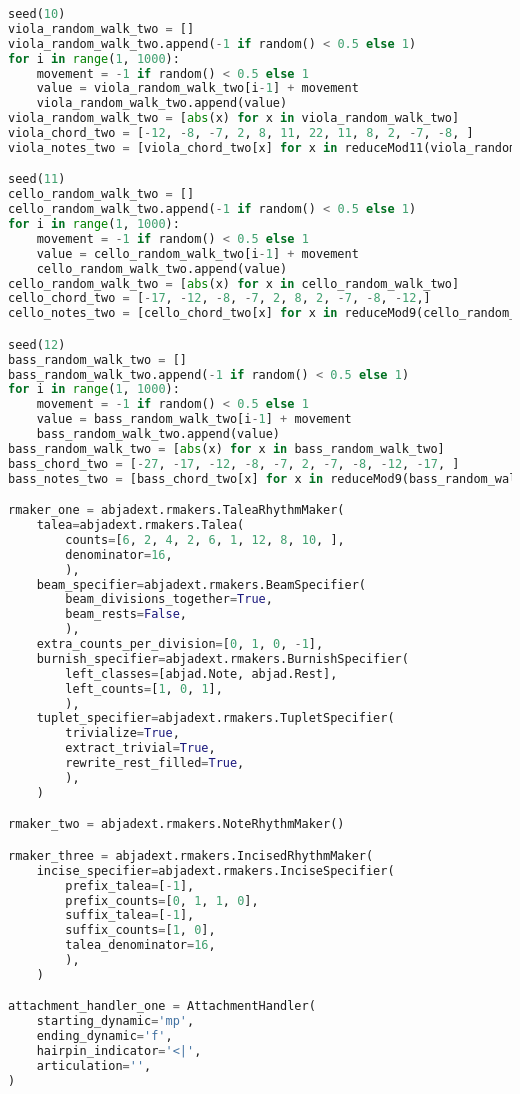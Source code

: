 \begin{lstlisting}[language=Python, caption=Tianshu Segment\_III]
seed(10)
viola_random_walk_two = []
viola_random_walk_two.append(-1 if random() < 0.5 else 1)
for i in range(1, 1000):
    movement = -1 if random() < 0.5 else 1
    value = viola_random_walk_two[i-1] + movement
    viola_random_walk_two.append(value)
viola_random_walk_two = [abs(x) for x in viola_random_walk_two]
viola_chord_two = [-12, -8, -7, 2, 8, 11, 22, 11, 8, 2, -7, -8, ]
viola_notes_two = [viola_chord_two[x] for x in reduceMod11(viola_random_walk_two)]

seed(11)
cello_random_walk_two = []
cello_random_walk_two.append(-1 if random() < 0.5 else 1)
for i in range(1, 1000):
    movement = -1 if random() < 0.5 else 1
    value = cello_random_walk_two[i-1] + movement
    cello_random_walk_two.append(value)
cello_random_walk_two = [abs(x) for x in cello_random_walk_two]
cello_chord_two = [-17, -12, -8, -7, 2, 8, 2, -7, -8, -12,]
cello_notes_two = [cello_chord_two[x] for x in reduceMod9(cello_random_walk_two)]

seed(12)
bass_random_walk_two = []
bass_random_walk_two.append(-1 if random() < 0.5 else 1)
for i in range(1, 1000):
    movement = -1 if random() < 0.5 else 1
    value = bass_random_walk_two[i-1] + movement
    bass_random_walk_two.append(value)
bass_random_walk_two = [abs(x) for x in bass_random_walk_two]
bass_chord_two = [-27, -17, -12, -8, -7, 2, -7, -8, -12, -17, ]
bass_notes_two = [bass_chord_two[x] for x in reduceMod9(bass_random_walk_two)]

rmaker_one = abjadext.rmakers.TaleaRhythmMaker(
    talea=abjadext.rmakers.Talea(
        counts=[6, 2, 4, 2, 6, 1, 12, 8, 10, ],
        denominator=16,
        ),
    beam_specifier=abjadext.rmakers.BeamSpecifier(
        beam_divisions_together=True,
        beam_rests=False,
        ),
    extra_counts_per_division=[0, 1, 0, -1],
    burnish_specifier=abjadext.rmakers.BurnishSpecifier(
        left_classes=[abjad.Note, abjad.Rest],
        left_counts=[1, 0, 1],
        ),
    tuplet_specifier=abjadext.rmakers.TupletSpecifier(
        trivialize=True,
        extract_trivial=True,
        rewrite_rest_filled=True,
        ),
    )

rmaker_two = abjadext.rmakers.NoteRhythmMaker()

rmaker_three = abjadext.rmakers.IncisedRhythmMaker(
    incise_specifier=abjadext.rmakers.InciseSpecifier(
        prefix_talea=[-1],
        prefix_counts=[0, 1, 1, 0],
        suffix_talea=[-1],
        suffix_counts=[1, 0],
        talea_denominator=16,
        ),
    )

attachment_handler_one = AttachmentHandler(
    starting_dynamic='mp',
    ending_dynamic='f',
    hairpin_indicator='<|',
    articulation='',
)


\end{lstlisting}
